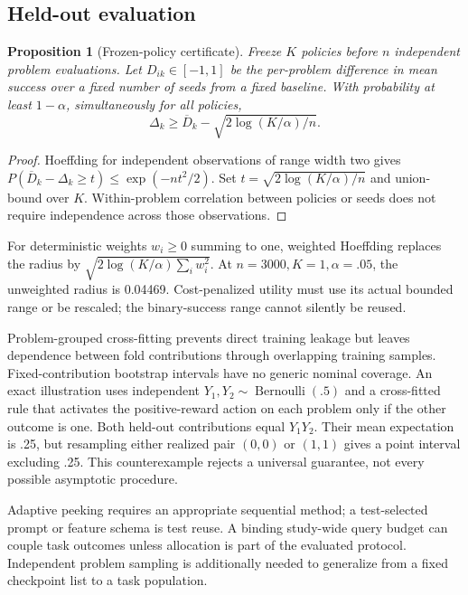 \documentclass[11pt]{article}
\newtheorem{proposition}{Proposition}
\begin{document}
\subsection{Held-out evaluation}
\begin{proposition}[Frozen-policy certificate]
Freeze $K$ policies before $n$ independent problem evaluations. Let $D_{ik}\in[-1,1]$ be the per-problem difference in mean success over a fixed number of seeds from a fixed baseline. With probability at least $1-\alpha$, simultaneously for all policies,
\[
\Delta_k\geq\overline D_k-\sqrt{2\log(K/\alpha)/n}.
\]
\end{proposition}
\begin{proof}
Hoeffding for independent observations of range width two gives
$P(\overline D_k-\Delta_k\geq t)\leq\exp(-nt^2/2)$.
Set $t=\sqrt{2\log(K/\alpha)/n}$ and union-bound over $K$. Within-problem correlation between policies or seeds does not require independence across those observations.
\end{proof}
For deterministic weights $w_i\geq0$ summing to one, weighted Hoeffding replaces the radius by $\sqrt{2\log(K/\alpha)\sum_iw_i^2}$. At $n=3000,K=1,\alpha=.05$, the unweighted radius is 0.04469. Cost-penalized utility must use its actual bounded range or be rescaled; the binary-success range cannot silently be reused.

Problem-grouped cross-fitting prevents direct training leakage but leaves dependence between fold contributions through overlapping training samples. Fixed-contribution bootstrap intervals have no generic nominal coverage. An exact illustration uses independent $Y_1,Y_2\sim\operatorname{Bernoulli}(.5)$ and a cross-fitted rule that activates the positive-reward action on each problem only if the other outcome is one. Both held-out contributions equal $Y_1Y_2$. Their mean expectation is .25, but resampling either realized pair $(0,0)$ or $(1,1)$ gives a point interval excluding .25. This counterexample rejects a universal guarantee, not every possible asymptotic procedure.

Adaptive peeking requires an appropriate sequential method; a test-selected prompt or feature schema is test reuse. A binding study-wide query budget can couple task outcomes unless allocation is part of the evaluated protocol. Independent problem sampling is additionally needed to generalize from a fixed checkpoint list to a task population.
\end{document}
